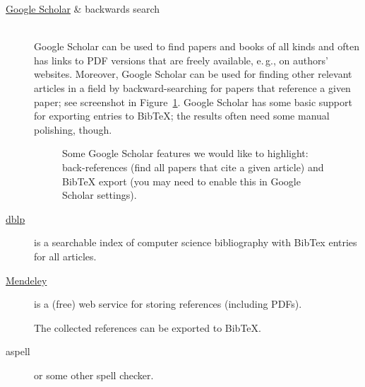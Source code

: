 \documentclass[]{rptuseminar}
\begin{document}
\begin{description}
	\item[\href{http://scholar.google.com}{Google Scholar} \& backwards search]
		~\\ %
		Google Scholar can be used to find papers and books of all kinds and often has links to PDF versions that are freely available, e.\,g., on authors' websites.
		Moreover, Google Scholar can be used for finding other relevant articles in a field by backward-searching for papers that reference a given paper; see screenshot in Figure~\ref{fig:scholar}. %
		Google Scholar has some basic support for exporting entries to BibTeX; the results often need some manual polishing, though.

		\begin{figure}
			\begin{center}
			\end{center}
			\caption{%
				Some Google Scholar features we would like to highlight: back-references (find all papers that cite a given article) and BibTeX export (you may need to enable this in Google Scholar settings).
			}
			\label{fig:scholar} %
		\end{figure}

	\item[\href{http://dblp.uni-trier.de/}{dblp}] is a searchable index of computer science bibliography with BibTex entries for all articles.

	\item[\href{http://www.mendeley.com}{Mendeley}] is a (free) web service for storing references (including PDFs).

		The collected references can be exported to BibTeX.

	\item[aspell] or some other spell checker.


\end{description}
\end{document}
